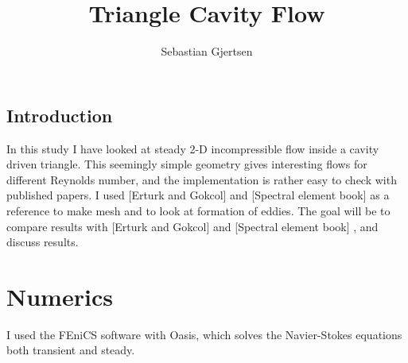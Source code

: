 \documentclass[a4paper,norsk]{article}
\title{Triangle Cavity Flow}
\author{Sebastian Gjertsen}
\begin{document}
\maketitle
\begin{center}
\section*{Introduction}
In this study I have looked at steady 2-D incompressible flow inside a cavity driven triangle. This seemingly simple geometry gives interesting flows for different Reynolds number, and the implementation is rather easy to check with published papers. I used [Erturk and Gokcol] and [Spectral element book]  as a reference to make mesh and to look at formation of eddies. The goal will be to compare results with [Erturk and Gokcol] and [Spectral element book] , and discuss results.
\end{center}
\section*{Numerics}
I used the FEniCS software with Oasis, which solves the Navier-Stokes equations both transient and steady. 
\end{document}
